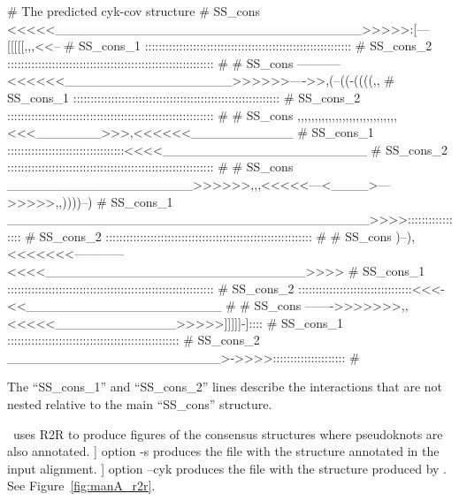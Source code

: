 \begin{sreoutput}
# The predicted cyk-cov structure
# SS_cons   <<<<<_________________________________>>>>>:[---[[[[[,,,<<--
# SS_cons_1 ::::::::::::::::::::::::::::::::::::::::::::::::::::::::::::
# SS_cons_2 ::::::::::::::::::::::::::::::::::::::::::::::::::::::::::::
#
# SS_cons   -----------<<<<<<__________________>>>>>>---->>,(--((-((((,,
# SS_cons_1 ::::::::::::::::::::::::::::::::::::::::::::::::::::::::::::
# SS_cons_2 ::::::::::::::::::::::::::::::::::::::::::::::::::::::::::::
#
# SS_cons   ,,,,,,,,,,,,,,,,,,,,,,,,,,,,,<<<_______>>>,<<<<<<___________
# SS_cons_1 ::::::::::::::::::::::::::::::::::<<<<______________________
# SS_cons_2 ::::::::::::::::::::::::::::::::::::::::::::::::::::::::::::
#
# SS_cons   ____________________>>>>>>,,,<<<<<---<____>--->>>>>,,))))--)
# SS_cons_1 _______________________________________>>>>:::::::::::::::::
# SS_cons_2 ::::::::::::::::::::::::::::::::::::::::::::::::::::::::::::
#
# SS_cons   )--),<<<<<<<------------<<<<____________________________>>>>
# SS_cons_1 ::::::::::::::::::::::::::::::::::::::::::::::::::::::::::::
# SS_cons_2 :::::::::::::::::::::::::::::::::<<<-<<_____________________
#
# SS_cons   ------->>>>>>>,,<<<<<_____________>>>>>]]]]]-]::::
# SS_cons_1 ::::::::::::::::::::::::::::::::::::::::::::::::::
# SS_cons_2 _______________________>->>>>:::::::::::::::::::::
#
\end{sreoutput}

\noindent
 The ``SS\_cons\_1'' and ``SS\_cons\_2'' lines describe the
 interactions that are not nested relative to the main ``SS\_cons''
 structure.

\rscape\, uses R2R to produce figures of the consensus structures
where pseudoknots are also annotated.  \rscape] option -s produces the
  file  with the structure
  annotated in the input alignment. \rscape] option --cyk produces the
    file  with the
    structure produced by \rscape. See Figure~\ref{fig:manA_r2r}.


